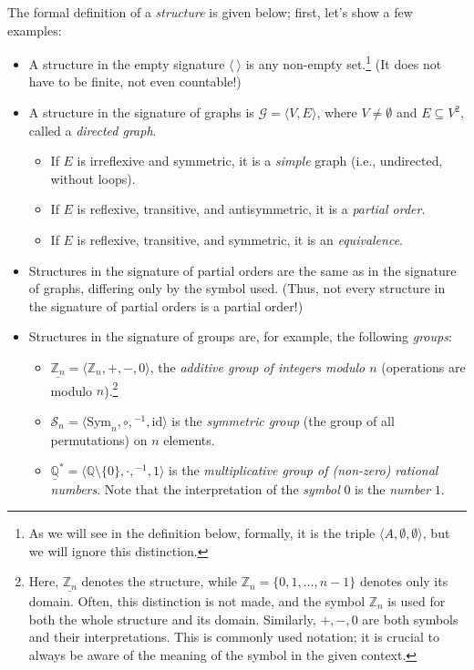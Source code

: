 \begin{example} \label{example:signatures}
    The formal definition of a \emph{structure} is given below; first, let's show a few examples:
\begin{itemize}
    \item A structure in the empty signature $\langle\ \rangle$ is any non-empty set.\footnote{As we will see in the definition below, formally, it is the triple $\langle A,\emptyset,\emptyset\rangle$, but we will ignore this distinction.} (It does not have to be finite, not even countable!)
    \item A structure in the signature of graphs is $\mathcal G=\langle V,E\rangle$, where $V\neq\emptyset$ and $E\subseteq V^2$, called a \emph{directed graph}. 
    \begin{itemize}
        \item If $E$ is irreflexive and symmetric, it is a \emph{simple} graph (i.e., undirected, without loops).
        \item If $E$ is reflexive, transitive, and antisymmetric, it is a \emph{partial order}.
        \item If $E$ is reflexive, transitive, and symmetric, it is an \emph{equivalence}.
    \end{itemize}
    \item Structures in the signature of partial orders are the same as in the signature of graphs, differing only by the symbol used. (Thus, not every structure in the signature of partial orders is a partial order!)
    \item Structures in the signature of groups are, for example, the following \emph{groups}:
    \begin{itemize}
        \item $\underline{\mathbb Z_n}=\langle\mathbb Z_n,+,-,0\rangle$, the \emph{additive group of integers modulo $n$} (operations are modulo $n$).\footnote{Here, $\underline{\mathbb Z_n}$ denotes the structure, while $\mathbb Z_n=\{0,1,\dots,n-1\}$ denotes only its domain. Often, this distinction is not made, and the symbol $\mathbb Z_n$ is used for both the whole structure and its domain. Similarly, $+,-,0$ are both symbols and their interpretations. This is commonly used notation; it is crucial to always be aware of the meaning of the symbol in the given context.}
        \item $\mathcal S_n=\langle \mathrm{Sym}_n,\circ,{}^{-1},\mathrm{id}\rangle$ is the \emph{symmetric group} (the group of all permutations) on $n$ elements.
        \item $\underline{\mathbb Q}^*=\langle \mathbb Q\setminus\{0\},\cdot,{}^{-1},1\rangle$ is the \emph{multiplicative group of (non-zero) rational numbers}. Note that the interpretation of the \emph{symbol} $0$ is the \emph{number} $1$.

\end{itemize}
\end{itemize}
\end{example}

